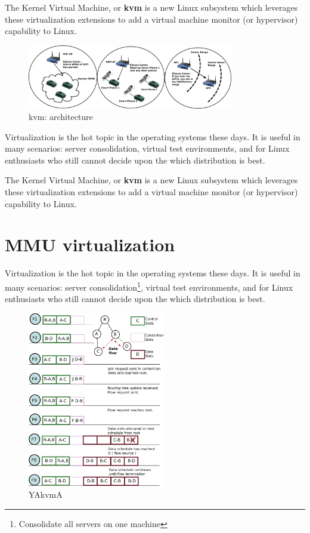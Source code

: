\documentclass[a4paper,twocolumn,10pt]{article}
\begin{document}
  \noindent The Kernel Virtual Machine, or \textbf{kvm} is a new Linux
  subsystem which leverages these virtualization extensions
  to add a virtual machine monitor (or hypervisor) capability to Linux.

  
   \begin{figure}[h]
     \centering
      \includegraphics[width=90mm]{arch.pdf}
      \caption{kvm: architecture}
      \label{arch}
   \end{figure}

  
  \noindent Virtualization is the hot topic in the operating systems 
  these days. It is useful in many scenarios: server consolidation,
  virtual test environments, and for Linux enthusiasts who
  still cannot decide upon the which distribution is best.
  
  \noindent The Kernel Virtual Machine, or \textbf{kvm} is a new Linux
  subsystem which leverages these virtualization extensions
  to add a virtual machine monitor (or hypervisor) capability to Linux.
  \pagebreak
  
  
\section{MMU virtualization}
Virtualization is the hot topic in the operating systems 
  these days. It is useful in many scenarios: server consolidation\footnote{Consolidate all servers on one machine},
  virtual test environments, and for Linux enthusiasts who
  still cannot decide upon the which distribution is best.
  
  \begin{figure}
   \centering
   \includegraphics[width=60mm]{arch1.pdf}
   \caption{YAkvmA}
   \label{arch1}
  \end{figure}
\end{document}
